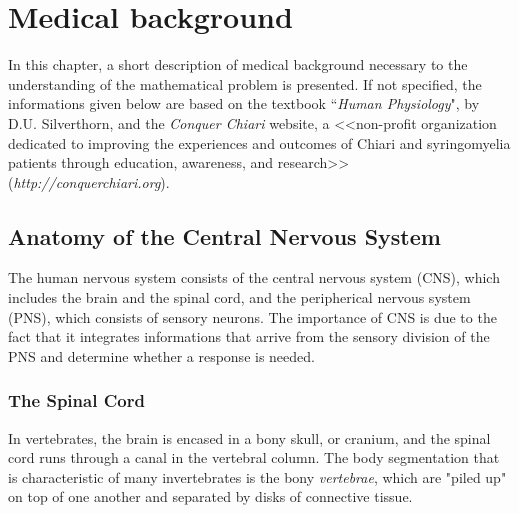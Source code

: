 \documentclass[a4paper,11pt,openright,twoside]{book}
\begin{document}
\chapter{Medical background}
In this chapter, a short description of medical background necessary to the understanding of the mathematical problem is presented. If not specified, the informations given below are based on the textbook ``\emph{Human Physiology}", by D.U. Silverthorn, and the \emph{Conquer Chiari} website, a <<non-profit organization dedicated to improving the experiences and outcomes of Chiari and syringomyelia patients through education, awareness, and research>>  (\emph{http://conquerchiari.org}).

\section{Anatomy of the Central Nervous System}
The human nervous system consists of the central nervous system (CNS), which includes the brain and the spinal cord, and the peripherical nervous system (PNS), which consists of sensory neurons.  The importance of CNS is due to the fact that it integrates informations that arrive from the sensory division of the PNS and determine whether a response is needed. 

\subsection{The Spinal Cord}
In vertebrates, the brain is encased in a bony skull, or cranium, and the spinal cord runs through a canal in the vertebral column. The body segmentation that is characteristic of many invertebrates is the bony \emph{vertebrae}, which are "piled up" on top of one another and separated by disks of connective tissue. 

\newpage
\end{document}
